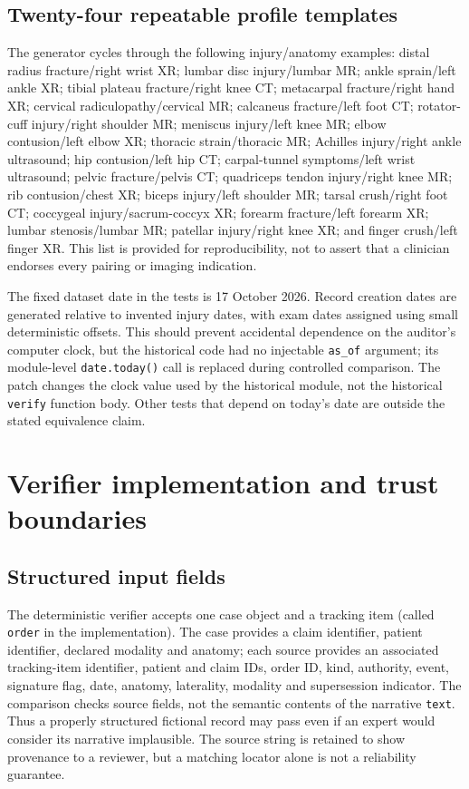 \documentclass[11pt,twocolumn]{article}
\newcommand{\code}[1]{\texttt{#1}}
\begin{document}
\subsection{Twenty-four repeatable profile templates}
The generator cycles through the following injury/anatomy examples: distal radius fracture/right wrist XR; lumbar disc injury/lumbar MR; ankle sprain/left ankle XR; tibial plateau fracture/right knee CT; metacarpal fracture/right hand XR; cervical radiculopathy/cervical MR; calcaneus fracture/left foot CT; rotator-cuff injury/right shoulder MR; meniscus injury/left knee MR; elbow contusion/left elbow XR; thoracic strain/thoracic MR; Achilles injury/right ankle ultrasound; hip contusion/left hip CT; carpal-tunnel symptoms/left wrist ultrasound; pelvic fracture/pelvis CT; quadriceps tendon injury/right knee MR; rib contusion/chest XR; biceps injury/left shoulder MR; tarsal crush/right foot CT; coccygeal injury/sacrum-coccyx XR; forearm fracture/left forearm XR; lumbar stenosis/lumbar MR; patellar injury/right knee XR; and finger crush/left finger XR. This list is provided for reproducibility, not to assert that a clinician endorses every pairing or imaging indication.

The fixed dataset date in the tests is 17 October 2026. Record creation dates are generated relative to invented injury dates, with exam dates assigned using small deterministic offsets. This should prevent accidental dependence on the auditor's computer clock, but the historical code had no injectable \code{as\_of} argument; its module-level \code{date.today()} call is replaced during controlled comparison. The patch changes the clock value used by the historical module, not the historical \code{verify} function body. Other tests that depend on today's date are outside the stated equivalence claim.

\section{Verifier implementation and trust boundaries}\label{sec:implementation}
\subsection{Structured input fields}
The deterministic verifier accepts one case object and a tracking item (called \code{order} in the implementation). The case provides a claim identifier, patient identifier, declared modality and anatomy; each source provides an associated tracking-item identifier, patient and claim IDs, order ID, kind, authority, event, signature flag, date, anatomy, laterality, modality and supersession indicator. The comparison checks source fields, not the semantic contents of the narrative \code{text}. Thus a properly structured fictional record may pass even if an expert would consider its narrative implausible. The source string is retained to show provenance to a reviewer, but a matching locator alone is not a reliability guarantee.
\end{document}
